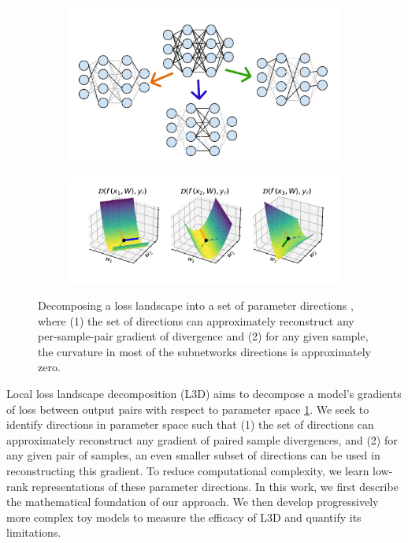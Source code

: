 \documentclass{article}
\theoremstyle{plain}
\theoremstyle{definition}
\theoremstyle{remark}
\begin{document}
\begin{figure}
    \begin{subfigure}{\columnwidth}
        \centering
        \includegraphics[width=.7\textwidth]{../figures/1b_jacobian_diagram.pdf}
    \end{subfigure}
    \begin{subfigure}{\columnwidth}
        \centering
        \includegraphics[width=\textwidth]{../figures/1a_jacobian_diagram.pdf}
    \end{subfigure} \caption{Decomposing a loss landscape into a set of parameter directions , where (1) the set of directions can approximately reconstruct any per-sample-pair gradient of divergence and (2) for any given sample, the curvature in most of the subnetworks directions is approximately zero.}\label{fig:1_jacobian_diagram}
    
\end{figure}


Local loss landscape decomposition (L3D) aims to decompose a model's gradients of loss between output pairs with respect to parameter space \ref{fig:1_jacobian_diagram}. We seek to identify directions in parameter space such that (1) the set of directions can approximately reconstruct any gradient of paired sample divergences, and (2) for any given pair of samples, an even smaller subset of directions can be used in reconstructing this gradient. To reduce computational complexity, we learn low-rank representations of these parameter directions. In this work, we first describe the mathematical foundation of our approach. We then develop progressively more complex toy models to measure the efficacy of L3D and quantify its limitations. %
\end{document}
